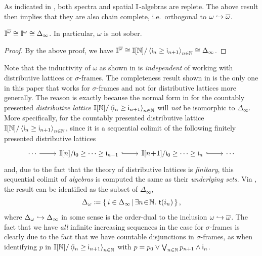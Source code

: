 \begin{remark}
  As indicated in , both spectra and spatial $\mathbb{I}$-algebras are replete. The above result then implies that they are also chain complete, i.e.\ orthogonal to $\omega\hookrightarrow\overline{\omega}$.
\end{remark}

\begin{corollary}[\AxiomNT, \AxiomSQCC]
  $\mathbb{I}^{\overline{\omega}} \cong \mathbb{I}^\omega \cong \Delta_\infty$. In particular, $\omega$ is not sober.
\end{corollary}
\begin{proof}
  By the above proof, we have $\mathbb{I}^{\overline{\omega}} \cong \mathbb{I}[\mathbb{N}]/\left\langle\mathsf{i}_n \ge \mathsf{i}_{n+1}\right\rangle_{n\in\mathbb{N}} \cong \Delta_\infty$.
\end{proof}

\begin{remark}\label{rem:whynotdis}
  Note that the inductivity of $\omega$ as shown in  is \emph{independent} of working with distributive lattices or $\sigma$-frames. The completeness result shown in  is the only one in this paper that works for $\sigma$-frames and not for distributive lattices more generally. The reason is exactly because the normal form in  for the countably presented \emph{distributive lattice} $\mathbb{I}[\mathbb{N}]/\left\langle\mathsf{i}_n \ge \mathsf{i}_{n+1}\right\rangle_{n\in\mathbb{N}}$ will \emph{not} be isomorphic to $\Delta_\infty$. More specifically, for the countably presented distributive lattice $\mathbb{I}[\mathbb{N}]/\left\langle\mathsf{i}_n \ge \mathsf{i}_{n+1}\right\rangle_{n\in\mathbb{N}}$, since it is a sequential colimit of the following finitely presented distributive lattices
  \[ 
  \begin{tikzcd}
    \cdots \ar[r] & \mbb{I}[n]/\ms{i}_{0} \ge \cdots \ge \ms{i}_{n-1} \ar[r, hook] & \mbb{I}[n\!+\!1]/\ms{i}_0 \ge \cdots \ge \ms{i}_n \ar[r, hook] & \cdots
  \end{tikzcd}
  \]
  and, due to the fact that the theory of distributive lattices is \emph{finitary}, this sequential colimit of \emph{algebras} is computed the same as their \emph{underlying sets}. Via , the result can be identified as the subset of $\Delta_\infty$,
  \[ \Delta_\omega \coloneq \left\{\,i \in \Delta_\infty\,\middle|\,\exists n\!\in\!\mathbb{N}.\  \mathsf{t}(i_n)\,\right\}\text{,} \]
  where $\Delta_\omega \hookrightarrow \Delta_\infty$ in some sense is the order-dual to the inclusion $\omega\hookrightarrow\overline{\omega}$. The fact that we have \emph{all} infinite increasing sequences in the case for $\sigma$-frames is clearly due to the fact that we have countable disjunctions in $\sigma$-frames, as when identifying $p$ in $\mathbb{I}[\mathbb{N}]/\left\langle\mathsf{i}_n \ge \mathsf{i}_{n+1}\right\rangle_{n\in\mathbb{N}}$ with $p = p_0 \vee \bigvee_{n\in\mathbb{N}}p_{n+1}\wedge \mathsf{i}_n$.
\end{remark}


